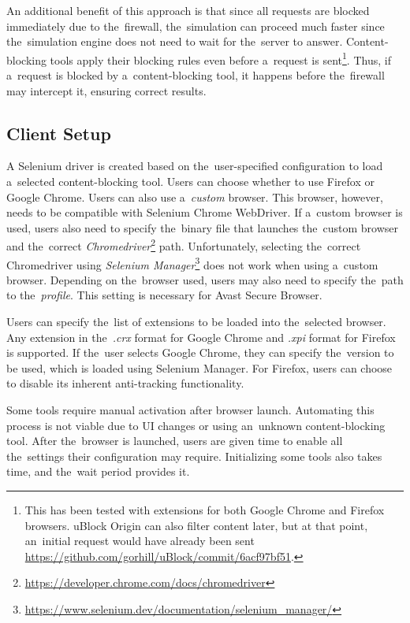An additional benefit of this approach is that since all requests are blocked immediately due to the~firewall, the~simulation can proceed much faster since the~simulation engine does not need to wait for the~server to answer. Content-blocking tools apply their blocking rules even before a~request is sent\footnote{This has been tested with extensions for both Google Chrome and Firefox browsers. uBlock Origin can also filter content later, but at that point, an~initial request would have already been sent \url{https://github.com/gorhill/uBlock/commit/6acf97bf51}.}. Thus, if a~request is blocked by a~content-blocking tool, it happens before the~firewall may intercept it, ensuring correct results.

\subsection{Client Setup}
A Selenium driver is created based on the~user-specified configuration to load a~selected content-blocking tool. Users can choose whether to use Firefox or Google Chrome. Users can also use a~\textit{custom} browser. This browser, however, needs to be compatible with Selenium Chrome WebDriver. If a~custom browser is used, users also need to specify the~binary file that launches the~custom browser and the~correct \textit{Chromedriver}\footnote{\url{https://developer.chrome.com/docs/chromedriver}} path. Unfortunately, selecting the~correct Chromedriver using \textit{Selenium Manager}\footnote{\url{https://www.selenium.dev/documentation/selenium_manager/}} does not work when using a~custom browser. Depending on the~browser used, users may also need to specify the~path to the~\textit{profile}. This setting is necessary for Avast Secure Browser.

Users can specify the~list of extensions to be loaded into the~selected browser. Any extension in the~\textit{.crx} format for Google Chrome and \textit{.xpi} format for Firefox is supported. If the~user selects Google Chrome, they can specify the~version to be used, which is loaded using Selenium Manager. For Firefox, users can choose to disable its inherent anti-tracking functionality.

Some tools require manual activation after browser launch. Automating this process is not viable due to UI changes or using an~unknown content-blocking tool. After the~browser is launched, users are given time to enable all the~settings their configuration may require. Initializing some tools also takes time, and the~wait period provides it.

